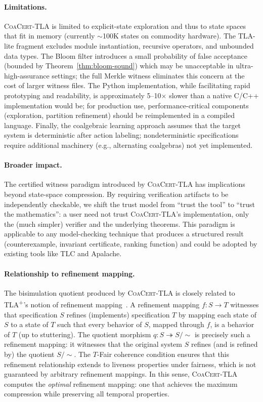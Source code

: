 \documentclass[11pt]{article}
\newcommand{\TFair}{$T$-Fair}
\newcommand{\CoaCert}{\textsc{CoaCert-TLA}}
\newcommand{\TLAplus}{TLA\textsuperscript{+}}
\begin{document}
\paragraph{Limitations.}
\CoaCert{} is limited to explicit-state exploration and thus to state
spaces that fit in memory (currently ${\sim}$100K states on commodity
hardware).
The TLA-lite fragment excludes module instantiation, recursive operators,
and unbounded data types.
The Bloom filter introduces a small probability of false acceptance
(bounded by Theorem~\ref{thm:bloom-sound}) which may be unacceptable
in ultra-high-assurance settings; the full Merkle witness eliminates
this concern at the cost of larger witness files.
The Python implementation, while facilitating rapid prototyping and
readability, is approximately 5--10$\times$ slower than a native
C/C++ implementation would be; for production use, performance-critical
components (exploration, partition refinement) should be reimplemented
in a compiled language.
Finally, the coalgebraic learning approach assumes that the target
system is deterministic after action labeling; nondeterministic
specifications require additional machinery (e.g., alternating
coalgebras) not yet implemented.

\paragraph{Broader impact.}
The certified witness paradigm introduced by \CoaCert{} has implications
beyond state-space compression.
By requiring verification artifacts to be independently checkable,
we shift the trust model from ``trust the tool'' to ``trust the
mathematics'': a user need not trust \CoaCert{}'s implementation,
only the (much simpler) verifier and the underlying theorems.
This paradigm is applicable to any model-checking technique that
produces a structured result (counterexample, invariant certificate,
ranking function) and could be adopted by existing tools like TLC
and Apalache.

\paragraph{Relationship to refinement mapping.}
The bisimulation quotient produced by \CoaCert{} is closely related to
\TLAplus{}'s notion of refinement mapping~\cite{Lamport94}.
A refinement mapping $f : S \to T$ witnesses that specification $S$ refines
(implements) specification $T$ by mapping each state of $S$ to a state
of $T$ such that every behavior of $S$, mapped through $f$, is a behavior
of $T$ (up to stuttering).
The quotient morphism $q : S \twoheadrightarrow S/{\sim}$ is precisely such
a refinement mapping: it witnesses that the original system $S$ refines
(and is refined by) the quotient $S/{\sim}$.
The \TFair{} coherence condition ensures that this refinement relationship
extends to liveness properties under fairness, which is not guaranteed
by arbitrary refinement mappings.
In this sense, \CoaCert{} computes the \emph{optimal} refinement mapping:
one that achieves the maximum compression while preserving all temporal
properties.
\end{document}
